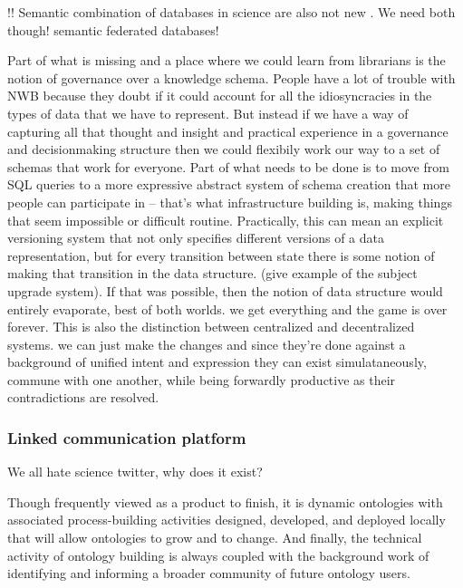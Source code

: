 \documentclass[11pt]{article}
\begin{document}
\begin{multicols}{2}
!! Semantic combination of databases in science are also not new \cite{cheungSemanticWebApproach2007, simaEnablingSemanticQueries2019} .
We need both though! semantic federated databases!

Part of what is missing and a place where we could learn from librarians
is the notion of governance over a knowledge schema. People have a lot
of trouble with NWB because they doubt if it could account for all the
idiosyncracies in the types of data that we have to represent. But
instead if we have a way of capturing all that thought and insight and
practical experience in a governance and decisionmaking structure then
we could flexibily work our way to a set of schemas that work for
everyone. Part of what needs to be done is to move from SQL queries to a
more expressive abstract system of schema creation that more people can
participate in -- that's what infrastructure building is, making things
that seem impossible or difficult routine. Practically, this can mean an
explicit versioning system that not only specifies different versions of
a data representation, but for every transition between state there is
some notion of making that transition in the data structure. (give
example of the subject upgrade system). If that was possible, then the
notion of data structure would entirely evaporate, best of both worlds.
we get everything and the game is over forever. This is also the
distinction between centralized and decentralized systems. we can just
make the changes and since they're done against a background of unified
intent and expression they can exist simulataneously, commune with one
another, while being forwardly productive as their contradictions are
resolved.

\hypertarget{linked-communication-platform}{%
\subsubsection{Linked communication
platform}\label{linked-communication-platform}}

We all hate science twitter, why does it exist?

\begin{leftbar}
Though frequently viewed as a product to finish, it is dynamic
ontologies with associated process-building activities designed,
developed, and deployed locally that will allow ontologies to grow and
to change. And finally, the technical activity of ontology building is
always coupled with the background work of identifying and informing a
broader community of future ontology users. \cite{bowkerInformationInfrastructureStudies2010} 
\end{leftbar}


\end{multicols}
\end{document}
